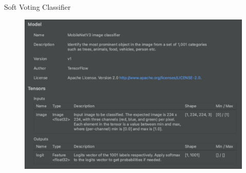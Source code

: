\documentclass{beamer}%
\begin{document}
\begin{frame}{Soft Voting Classifier}
\begin{changemargin}
\footnotesize


\begin{figure}[h]
\begin{minipage}[h]{0.91\linewidth}
\hbox{\hspace{-2em}\includegraphics[width=\linewidth]{img/mobilenet_v3_spec}}
\end{minipage}
\end{figure}

\end{changemargin}
\end{frame}
\end{document}
